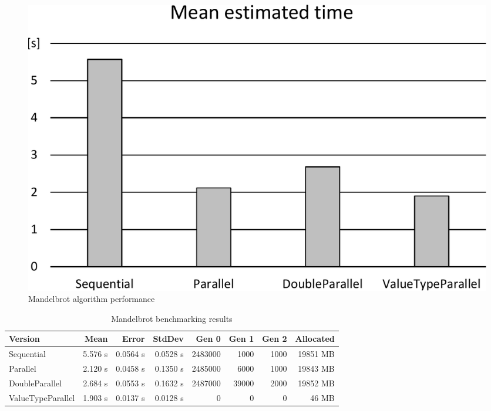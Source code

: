 \begin{figure}[htb]
\centering
\includegraphics[width=.8\linewidth]{figures04/Fig41.pdf}
\caption{Mandelbrot algorithm performance}
\label{fig: MandelbrotPerformance}
\end{figure}

\begin{table}[ht]%
    \centering
    \caption{Mandelbrot benchmarking results}
		\label{tab: MandelbrotBenchmarking}
    \begin{tabularx}{\linewidth}{Xrrrrrrr} \toprule
			\bfseries Version 	&
			\bfseries Mean    	&
			\bfseries Error	    &
			\bfseries StdDev	  &
			\bfseries Gen 0	    &
			\bfseries Gen 1	    &
			\bfseries Gen 2	    &
			\bfseries Allocated \\ \midrule
			Sequential & 5.576 s & 0.0564 s & 0.0528 s & 2483000 & 1000 & 1000 & 19851 MB \\ 
			Parallel & 2.120 s & 0.0458 s & 0.1350 s & 2485000 & 6000 & 1000 & 19843 MB \\ 
			DoubleParallel & 2.684 s & 0.0553 s & 0.1632 s & 2487000 & 39000 & 2000 & 19852 MB \\ 
			ValueTypeParallel & 1.903 s & 0.0137 s & 0.0128 s & 0 & 0 & 0 & 46 MB \\ 
			\bottomrule
	\end{tabularx}
\end{table}

